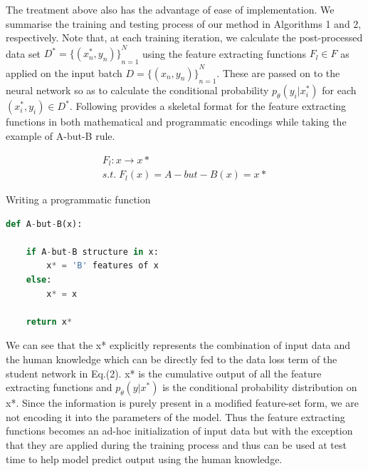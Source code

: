 \documentclass[12pt,a4paper]{article}
\begin{document}
The treatment above also has the advantage of ease of implementation. We summarise the training and testing process of our method in Algorithms 1 and 2, respectively. Note that, at each training iteration, we calculate the post-processed data set \begin{math} D^* = {\{ (x_n^*,y_n) \}}_{n=1}^N\end{math} using the feature extracting functions \begin{math}F_l \in F\end{math} as applied on the input batch \begin{math} D = {\{ (x_n,y_n) \}}_{n=1}^N\end{math}. These are passed on to the neural network so as to calculate the conditional probability $p_\theta(y_i|x_i^*)$ for each \begin{math}(x_i^*,y_i) \in D^*\end{math}.
Following provides a skeletal format for the feature extracting functions in both mathematical and programmatic encodings while taking the example of A-but-B rule.

\begin{gather*}
F_l\colon x \rightarrow x*\\
s.t. \; F_l(x) = A-but-B(x) = x*
\end{gather*}

\vspace{2mm}

Writing a programmatic function
\begin{lstlisting}[language=Python]
def A-but-B(x):
    
    if A-but-B structure in x:
        x* = 'B' features of x
    else:
        x* = x
    
    return x*
\end{lstlisting}

We can see that the x* explicitly represents the combination
of input data and the human knowledge which can be directly
fed to the data loss term of the student network in Eq.(2). x* is the cumulative output of all the feature extracting
functions and $p_\theta(y|x^*)$ is the conditional probability distribution on x*. Since the information is purely present in a
modified feature-set form, we are not encoding it into the
parameters of the model. Thus the feature extracting functions
becomes an ad-hoc initialization of input data but with the
exception that they are applied during the training process and
thus can be used at test time to help model predict output using
the human knowledge.
\end{document}
